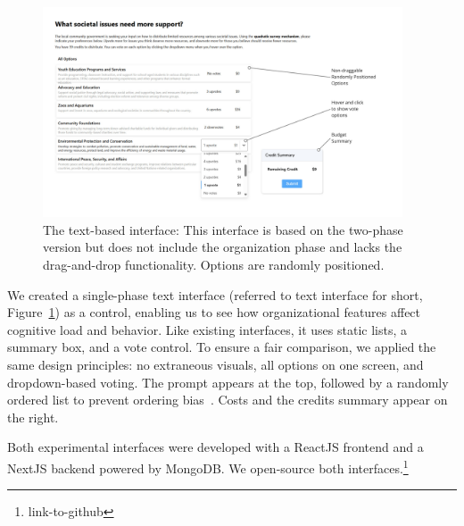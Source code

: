 \begin{figure}[!t]
    \centering
    \includegraphics[width=0.95\textwidth]{content/image/detailed_text.pdf}
    \caption{The text-based interface: This interface is based on the two-phase version but does not include the organization phase and lacks the drag-and-drop functionality. Options are randomly positioned.}
    \label{fig:textInterface}
\end{figure}

We created a single-phase text interface (referred to text interface for short, Figure~\ref{fig:textInterface}) as a control, enabling us to see how organizational features affect cognitive load and behavior. Like existing interfaces, it uses static lists, a summary box, and a vote control. To ensure a fair comparison, we applied the same design principles: no extraneous visuals, all options on one screen, and dropdown-based voting. The prompt appears at the top, followed by a randomly ordered list to prevent ordering bias~\cite{ferberOrderBiasMail1952, couperWebSurveyDesign2001}. Costs and the credits summary appear on the right.

Both experimental interfaces were developed with a ReactJS frontend and a NextJS backend powered by MongoDB. We open-source both interfaces.\footnote{link-to-github}